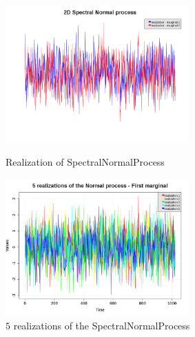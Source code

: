\begin{figure}[H]
  \begin{minipage}{9cm}
    \begin{center}
      \includegraphics[width=7cm]{Figures/spectralNormal2D_realization.png}
      \caption{Realization of SpectralNormalProcess}
      \label{spectralNormalProcess_Realization}
    \end{center}
  \end{minipage}
  \hfill
  \begin{minipage}{9cm}
    \begin{center}
      \includegraphics[width=7cm]{Figures/spectralNormal2D_realizations.png}
      \caption{$5$ realizations of the SpectralNormalProcess}
      \label{spectralNormalProcess_Realizations}
    \end{center}
  \end{minipage}
\end{figure}
